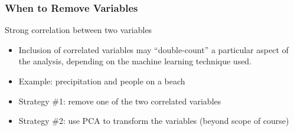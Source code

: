 \begin{frame}[fragile] \frametitle{When to Remove Variables}
 Strong correlation between two variables

\begin{itemize}
	\item Inclusion of correlated variables may ``double-count'' a particular aspect of the analysis, depending on the machine learning technique used.
	\item Example: precipitation and people on a beach
	\item Strategy \#1: remove one of the two correlated variables
	\item Strategy \#2: use PCA to transform the variables (beyond scope of course)
\end{itemize}
\end{frame}


